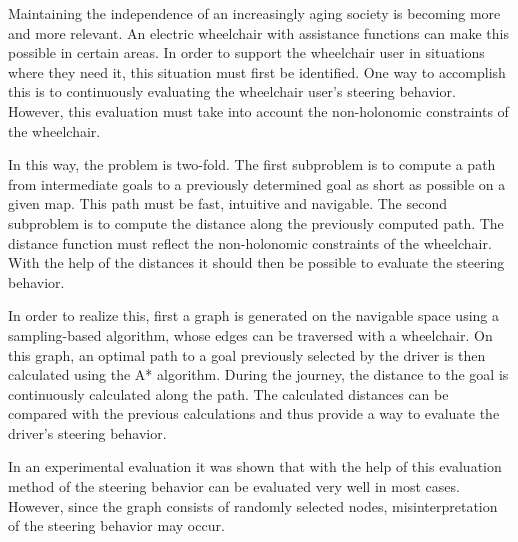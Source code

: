 



Maintaining the independence of an increasingly aging society is becoming more and more relevant. An electric wheelchair with assistance functions can make this possible in certain areas. In order to support the wheelchair user in situations where they need it, this situation must first be identified. One way to accomplish this is to continuously evaluating the wheelchair user's steering behavior. However, this evaluation must take into account the non-holonomic constraints of the wheelchair.

In this way, the problem is two-fold. The first subproblem is to compute a path from intermediate goals to a previously determined goal as short as possible on a given map. This path must be fast, intuitive and navigable. The second subproblem is to compute the distance along the previously computed path. The distance function must reflect the non-holonomic constraints of the wheelchair. With the help of the distances it should then be possible to evaluate the steering behavior.

In order to realize this, first a graph is generated on the navigable space using a sampling-based algorithm, whose edges can be traversed with a wheelchair. On this graph, an optimal path to a goal previously selected by the driver is then calculated using the A* algorithm. During the journey, the distance to the goal is continuously calculated along the path. The calculated distances can be compared with the previous calculations and thus provide a way to evaluate the driver's steering behavior.

In an experimental evaluation it was shown that with the help of this evaluation method of the steering behavior can be evaluated very well in most cases. However, since the graph consists of randomly selected nodes, misinterpretation of the steering behavior may occur.



